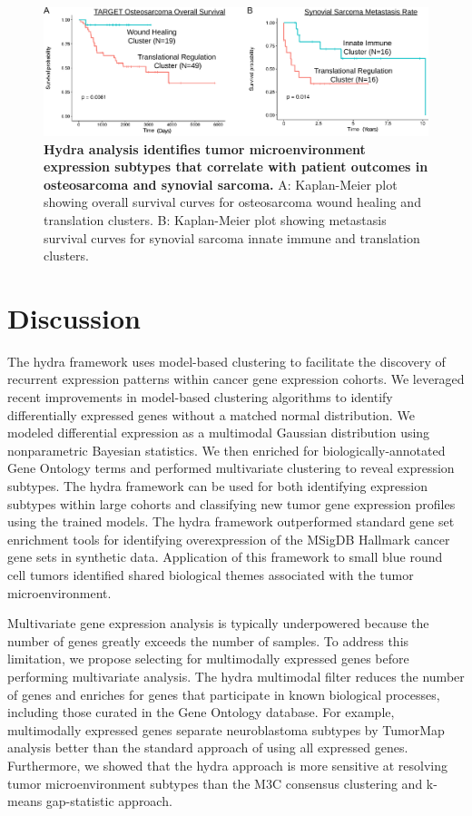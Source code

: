 \documentclass[10pt,letterpaper]{article}
\begin{document}
\begin{figure}[!h]
	\includegraphics[width=\textwidth]{img/PNG/synovial-osteo-sarcoma-survival-figure}
	\caption{{\bf Hydra analysis identifies tumor microenvironment expression subtypes that correlate with patient outcomes in osteosarcoma and synovial sarcoma.} A: Kaplan-Meier plot showing overall survival curves for osteosarcoma wound healing and translation clusters. B: Kaplan-Meier plot showing metastasis survival curves for synovial sarcoma innate immune and translation clusters.}
	\label{surv}
\end{figure}

\section*{Discussion}
The hydra framework uses model-based clustering to facilitate the discovery of recurrent expression patterns within cancer gene expression cohorts. We leveraged recent improvements in model-based clustering algorithms to identify differentially expressed genes without a matched normal distribution. We modeled differential expression as a multimodal Gaussian distribution using nonparametric Bayesian statistics. We then enriched for biologically-annotated Gene Ontology terms and performed multivariate clustering to reveal expression subtypes. The hydra framework can be used for both identifying expression subtypes within large cohorts and classifying new tumor gene expression profiles using the trained models. The hydra framework outperformed standard gene set enrichment tools for identifying overexpression of the MSigDB Hallmark cancer gene sets in synthetic data. Application of this framework to small blue round cell tumors identified shared biological themes associated with the tumor microenvironment.
 
Multivariate gene expression analysis is typically underpowered because the number of genes greatly exceeds the number of samples. To address this limitation, we propose selecting for multimodally expressed genes before performing multivariate analysis. The hydra multimodal filter reduces the number of genes and enriches for genes that participate in known biological processes, including those curated in the Gene Ontology database. For example, multimodally expressed genes separate neuroblastoma subtypes by TumorMap analysis better than the standard approach of using all expressed genes. Furthermore, we showed that the hydra approach is more sensitive at resolving tumor microenvironment subtypes than the M3C consensus clustering and k-means gap-statistic approach. 
\end{document}
